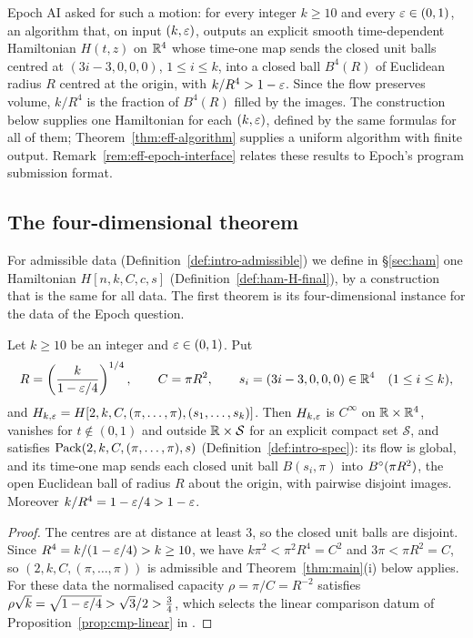 Epoch AI \cite{Epoch} asked for such a motion: for every integer $k\ge10$ and every $\varepsilon\in(0,1)$, an algorithm
that, on input $(k,\varepsilon)$, outputs an explicit smooth time-dependent Hamiltonian $H(t,z)$ on $\mathbb{R}^4$ whose time-one map sends the closed unit
balls centred at $(3i-3,0,0,0)$, $1\le i\le k$, into a closed ball $B^4(R)$ of Euclidean radius $R$ centred at the
origin, with $k/R^4>1-\varepsilon$. Since the flow preserves volume, $k/R^4$ is the fraction of $B^4(R)$ filled by the
images. The construction below supplies one Hamiltonian for each $(k,\varepsilon)$, defined by the same formulas
for all of them; Theorem~\ref{thm:eff-algorithm} supplies a uniform algorithm with finite output.
Remark~\ref{rem:eff-epoch-interface} relates these results to Epoch's program submission format.

\subsection{The four-dimensional theorem}\label{sec:intro-contribution}

For admissible data (Definition~\ref{def:intro-admissible}) we define in \S\ref{sec:ham} one Hamiltonian
$H[n,k,C,c,s]$ (Definition~\ref{def:ham-H-final}), by a construction that is the same for all data. The first theorem is its
four-dimensional instance for the data of the Epoch question.

\begin{maintheorem}\label{thm:intro-4d}
Let $k\ge10$ be an integer and $\varepsilon\in(0,1)$. Put
\[
 R=\left(\frac{k}{1-\varepsilon/4}\right)^{1/4},\qquad C=\pi R^2,\qquad s_i=(3i-3,0,0,0)\in\mathbb{R}^4\quad(1\le i\le k),
\]
and $H_{k,\varepsilon}=H[2,k,C,(\pi,\dots,\pi),(s_1,\dots,s_k)]$. Then $H_{k,\varepsilon}$ is $C^\infty$ on $\mathbb{R}\times\mathbb{R}^4$, vanishes
for $t\notin(0,1)$ and outside $\mathbb{R}\times\mathcal S$ for an explicit compact set $\mathcal S$, and satisfies
$\mathrm{Pack}(2,k,C,(\pi,\dots,\pi),s)$ (Definition~\ref{def:intro-spec}): its flow is global, and its time-one map sends each
closed unit ball $B(s_i,\pi)$ into $B^{\circ}(\pi R^2)$, the open Euclidean ball of radius $R$ about the origin, with pairwise
disjoint images. Moreover $k/R^4=1-\varepsilon/4>1-\varepsilon$.
\end{maintheorem}

\begin{proof}
The centres are at distance at least $3$, so the closed unit balls are disjoint. Since $R^4=k/(1-\varepsilon/4)>k\ge10$, we
have $k\pi^2<\pi^2R^4=C^2$ and $3\pi<\pi R^2=C$, so $(2,k,C,(\pi,\dots,\pi))$ is admissible and
Theorem~\ref{thm:main}(i) below applies. For these data the normalised capacity $\rho=\pi/C=R^{-2}$ satisfies
$\rho\sqrt k=\sqrt{1-\varepsilon/4}>\sqrt3/2>\frac34$, which selects the linear comparison datum of
Proposition~\ref{prop:cmp-linear} in .
\end{proof}

